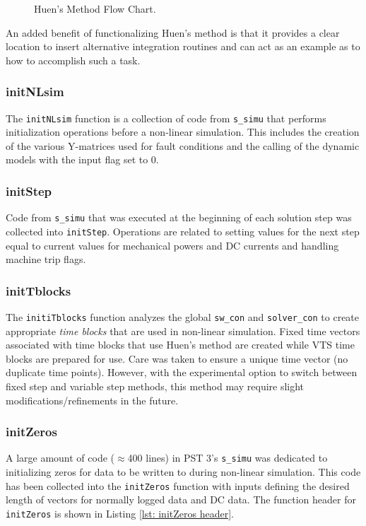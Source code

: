 \begin{figure}[H]
	\caption{Huen's Method Flow Chart.}
	\label{fig: huens block diagram}
\end{figure}\vspace{-1 em}

An added benefit of functionalizing Huen's method is that it provides a clear location to insert alternative integration routines and can act as an example as to how to accomplish such a task.

\subsubsection{initNLsim}  
The \verb|initNLsim| function is a collection of code from \verb|s_simu| that performs initialization operations before a non-linear simulation.
This includes the creation of the various Y-matrices used for fault conditions and the calling of the dynamic models with the input flag set to 0.

\subsubsection{initStep}  
Code from \verb|s_simu| that was executed at the beginning of each solution step was collected into \verb|initStep|.
Operations are related to setting values for the next step equal to current values for mechanical powers and DC currents and handling machine trip flags.

\subsubsection{initTblocks}  
The \verb|initiTblocks| function analyzes the global \verb|sw_con| and \verb|solver_con| to create appropriate \emph{time blocks} that are used in non-linear simulation.
Fixed time vectors associated with time blocks that use Huen's method are created while VTS time blocks are prepared for use.
Care was taken to ensure a unique time vector (no duplicate time points).
However, with the experimental option to switch between fixed step and variable step methods, this method may require slight modifications/refinements in the future.

\subsubsection{initZeros}  
A large amount of code ($\approx$400 lines) in PST 3's \verb|s_simu| was dedicated to initializing zeros for data to be written to during non-linear simulation.
This code has been collected into the \verb|initZeros| function with inputs defining the desired length of vectors for normally logged data and DC data.
The function header for \verb|initZeros| is shown in Listing \ref{lst: initZeros header}.

